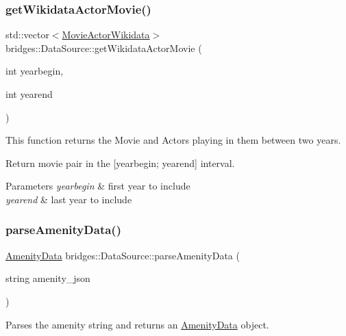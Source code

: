 \subsubsection{\texorpdfstring{get\+Wikidata\+Actor\+Movie()}{getWikidataActorMovie()}}
{\footnotesize\ttfamily std\+::vector$<$\hyperlink{classbridges_1_1dataset_1_1_movie_actor_wikidata}{Movie\+Actor\+Wikidata}$>$ bridges\+::\+Data\+Source\+::get\+Wikidata\+Actor\+Movie (\begin{DoxyParamCaption}\item[{int}]{yearbegin,  }\item[{int}]{yearend }\end{DoxyParamCaption})\hspace{0.3cm}{\ttfamily [inline]}}



This function returns the Movie and Actors playing in them between two years. 

Return movie pair in the \mbox{[}yearbegin; yearend\mbox{]} interval.


\begin{DoxyParams}{Parameters}
{\em yearbegin} & first year to include \\
\hline
{\em yearend} & last year to include \\
\hline
\end{DoxyParams}
\mbox{\label{classbridges_1_1_data_source_a04bebf8bfda48d1dc0e6c6e90fac8fbc}} 
\subsubsection{\texorpdfstring{parse\+Amenity\+Data()}{parseAmenityData()}}
{\footnotesize\ttfamily \hyperlink{class_amenity_data}{Amenity\+Data} bridges\+::\+Data\+Source\+::parse\+Amenity\+Data (\begin{DoxyParamCaption}\item[{string}]{amenity\+\_\+json }\end{DoxyParamCaption})\hspace{0.3cm}{\ttfamily [inline]}}



Parses the amenity string and returns an \hyperlink{class_amenity_data}{Amenity\+Data} object. 


